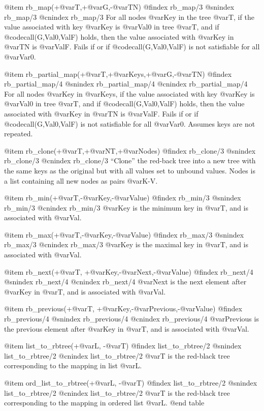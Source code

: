 {{{{{{{{{@item rb_map(+@var{T},+@var{G},-@var{TN})
@findex rb_map/3
@snindex rb_map/3
@cnindex rb_map/3
For all nodes @var{Key} in the tree @var{T}, if the value associated with
key @var{Key} is @var{Val0} in tree @var{T}, and if
@code{call(G,Val0,ValF)} holds, then the value associated with @var{Key}
in @var{TN} is @var{ValF}. Fails if or if @code{call(G,Val0,ValF)} is not
satisfiable for all @var{Var0}.

@item rb_partial_map(+@var{T},+@var{Keys},+@var{G},-@var{TN})
@findex rb_partial_map/4
@snindex rb_partial_map/4
@cnindex rb_partial_map/4
For all nodes @var{Key} in @var{Keys}, if the value associated with key
@var{Key} is @var{Val0} in tree @var{T}, and if @code{call(G,Val0,ValF)}
holds, then the value associated with @var{Key} in @var{TN} is
@var{ValF}. Fails if or if @code{call(G,Val0,ValF)} is not satisfiable
for all @var{Var0}. Assumes keys are not repeated.

@item rb_clone(+@var{T},+@var{NT},+@var{Nodes})
@findex rb_clone/3
@snindex rb_clone/3
@cnindex rb_clone/3
``Clone'' the red-back tree into a new tree with the same keys as the
original but with all values set to unbound values. Nodes is a list
containing all new nodes as pairs @var{K-V}.

@item rb_min(+@var{T},-@var{Key},-@var{Value})
@findex rb_min/3
@snindex rb_min/3
@cnindex rb_min/3
@var{Key}  is the minimum key in @var{T}, and is associated with @var{Val}.

@item rb_max(+@var{T},-@var{Key},-@var{Value})
@findex rb_max/3
@snindex rb_max/3
@cnindex rb_max/3
@var{Key}  is the maximal key in @var{T}, and is associated with @var{Val}.

@item rb_next(+@var{T}, +@var{Key},-@var{Next},-@var{Value})
@findex rb_next/4
@snindex rb_next/4
@cnindex rb_next/4
@var{Next} is the next element after @var{Key} in @var{T}, and is
associated with @var{Val}.

@item rb_previous(+@var{T}, +@var{Key},-@var{Previous},-@var{Value})
@findex rb_previous/4
@snindex rb_previous/4
@cnindex rb_previous/4
@var{Previous} is the previous element after @var{Key} in @var{T}, and is
associated with @var{Val}.

@item list_to_rbtree(+@var{L}, -@var{T})
@findex list_to_rbtree/2
@snindex list_to_rbtree/2
@cnindex list_to_rbtree/2
@var{T} is the red-black tree corresponding to the mapping in list @var{L}.

@item ord_list_to_rbtree(+@var{L}, -@var{T})
@findex list_to_rbtree/2
@snindex list_to_rbtree/2
@cnindex list_to_rbtree/2
@var{T} is the red-black tree corresponding to the mapping in ordered
list @var{L}.
@end table

}}}}}}}}}

